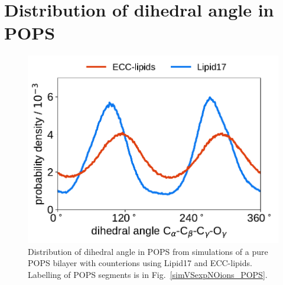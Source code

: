 \documentclass[journal=jpcbfk,manuscript=article]{achemso}
\newlength{\figwidth}
\begin{document}
\section{Distribution of dihedral angle  in POPS}
\begin{figure}[hbp!] 
  \centering 
  \includegraphics[width=\figwidth]{../img/dihedral_angle_distribution_Ca-Cb-Cg-Og_ECC-L17.pdf}
  \caption{\label{fig:dihedral}
    Distribution of dihedral angle  in POPS 
    from simulations of a pure POPS bilayer with  counterions using Lipid17 and ECC-lipids. 
    Labelling of POPS segments is in Fig.~\ref{simVSexpNOions_POPS}. 
}
\end{figure} 


\pagebreak
\end{document}
